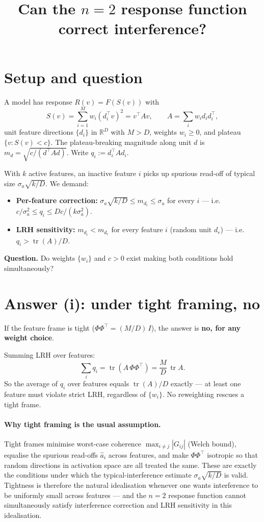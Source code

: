 \documentclass[11pt]{article}
\title{Can the $n=2$ response function correct interference?}
\author{}
\date{}
\newcommand{\tr}{\operatorname{tr}}
\newcommand{\RR}{\mathbb{R}}
\begin{document}
\maketitle

\section{Setup and question}

A model has response $R(v) = F(S(v))$ with
\[
  S(v) = \sum_{i=1}^M w_i (d_i^\top v)^2 = v^\top A v,
  \qquad A = \sum_i w_i d_i d_i^\top,
\]
unit feature directions $\{d_i\}$ in $\RR^D$ with $M > D$, weights
$w_i \ge 0$, and plateau $\{v : S(v) < c\}$. The plateau-breaking
magnitude along unit $d$ is $m_d = \sqrt{c / (d^\top A d)}$. Write
$q_i := d_i^\top A d_i$.

With $k$ active features, an inactive feature $i$ picks up spurious
read-off of typical size $\sigma_a\sqrt{k/D}$. We demand:

\begin{itemize}
  \item \textbf{Per-feature correction:}
    $\sigma_a\sqrt{k/D} \le m_{d_i} \le \sigma_a$ for every $i$ ---
    i.e.\ $c/\sigma_a^2 \le q_i \le Dc/(k\sigma_a^2)$.
  \item \textbf{LRH sensitivity:} $m_{d_i} < m_{d_r}$ for every
    feature $i$ (random unit $d_r$) --- i.e.\ $q_i > \tr(A)/D$.
\end{itemize}

\textbf{Question.} Do weights $\{w_i\}$ and $c > 0$ exist making both
conditions hold simultaneously?

\section{Answer (i): under tight framing, no}

If the feature frame is tight ($\Phi\Phi^\top = (M/D)\,I$), the answer
is \textbf{no, for any weight choice}.

Summing LRH over features:
\[
  \sum_i q_i = \tr(A\,\Phi\Phi^\top) = \frac{M}{D}\,\tr A.
\]
So the average of $q_i$ over features equals $\tr(A)/D$ exactly --- at
least one feature must violate strict LRH, regardless of
$\{w_i\}$. No reweighting rescues a tight frame.

\paragraph{Why tight framing is the usual assumption.}
Tight frames minimise worst-case coherence $\max_{i\ne j}|G_{ij}|$
(Welch bound), equalise the spurious read-offs $\hat a_i$ across
features, and make $\Phi\Phi^\top$ isotropic so that random directions
in activation space are all treated the same. These are exactly the
conditions under which the typical-interference estimate
$\sigma_a\sqrt{k/D}$ is valid. Tightness is therefore the natural
idealisation whenever one wants interference to be uniformly small
across features --- and the $n=2$ response function cannot
simultaneously satisfy interference correction and LRH sensitivity in
this idealisation.
\end{document}
